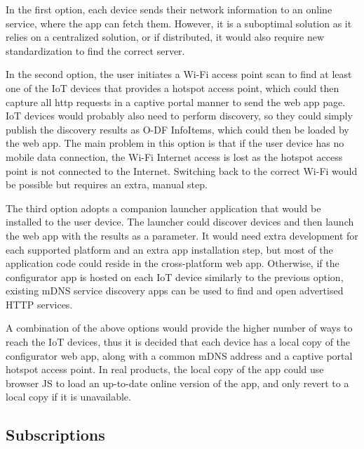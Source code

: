In the first option, each device sends their network information to an online service, where the app can fetch them. However, it is a suboptimal solution as it relies on a centralized solution, or if distributed, it would also require new standardization to find the correct server.

In the second option, the user initiates a Wi-Fi access point scan to find at least one of the IoT devices that provides a hotspot access point, which could then capture all http requests in a captive portal manner to send the web app page. IoT devices would probably also need to perform discovery, so they could simply publish the discovery results as O-DF InfoItems, which could then be loaded by the web app. The main problem in this option is that if the user device has no mobile data connection, the Wi-Fi Internet access is lost as the hotspot access point is not connected to the Internet. Switching back to the correct Wi-Fi would be possible but requires an extra, manual step.

The third option adopts a companion launcher application that would be installed to the user device. The launcher could discover devices and then launch the web app with the results as a parameter. It would need extra development for each supported platform and an extra app installation step, but most of the application code could reside in the cross-platform web app. Otherwise, if the configurator app is hosted on each IoT device similarly to the previous option, existing mDNS service discovery apps can be used to find and open advertised HTTP services.

A combination of the above options would provide the higher number of ways to reach the IoT devices, thus it is decided that each device has a local copy of the configurator web app, along with a common mDNS address and a captive portal hotspot access point. In real products, the local copy of the app could use browser JS to load an up-to-date online version of the app, and only revert to a local copy if it is unavailable.


\subsection{Subscriptions}
\label{section:subscriptions}

